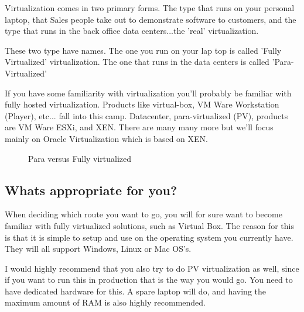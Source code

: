 Virtualization comes in two primary forms.  The type that runs on your
personal laptop, that Sales people take out to demonstrate software to
customers, and the type that runs in the back office data
centers...the 'real' virtualization.

These two type have names.  The one you run on your lap top is called
'Fully Virtualized' virtualization.  The one that runs in the data
centers is called 'Para-Virtualized'
	
If you have some familiarity with virtualization you'll probably be
familiar with fully hosted virtualization.  Products like virtual-box,
VM Ware Workstation (Player), etc... fall into this camp.  Datacenter,
para-virtualized (PV), products are VM Ware ESXi, and XEN.  There are
many many more but we'll focus mainly on Oracle Virtualization which
is based on XEN.
	
\begin{figure}[h!]
  \centering
  \caption{Para versus Fully virtualized}
\end{figure}

\subsection{Whats appropriate for you?}

When deciding which route you want to go, you will for sure want to
become familiar with fully virtualized solutions, such as Virtual Box.
The reason for this is that it is simple to setup and use on the
operating system you currently have.  They will all support Windows,
Linux or Mac OS's.
	
I would highly recommend that you also try to do PV virtualization as
well, since if you want to run this in production that is the way you
would go.  You need to have dedicated hardware for this.  A spare
laptop will do, and having the maximum amount of RAM is also highly
recommended.
